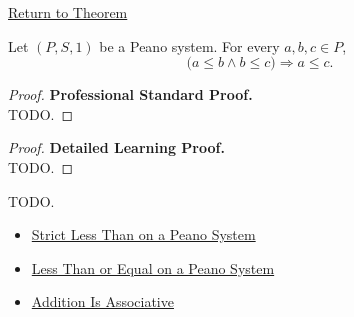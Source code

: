 \newpage
{}
\label{prf:order-transitive-on-peano-system}

\begin{remark*}[Return]
\hyperref[thm:order-transitive-on-peano-system]{Return to Theorem}
\end{remark*}

\begin{theorem*}
Let $(P,S,1)$ be a Peano system. For every $a,b,c \in P$,
\[
\bigl(a \le b \land b \le c\bigr)
\Longrightarrow
a \le c.
\]
\end{theorem*}

\begin{proof}
\textbf{Professional Standard Proof.}~\\
TODO.
\end{proof}

\begin{proof}
\textbf{Detailed Learning Proof.}~\\
TODO.
\end{proof}

\begin{remark*}
TODO.
\end{remark*}

\begin{dependencies}
\begin{itemize}
  \item \hyperref[def:strict-less-than-on-peano-system]{Strict Less Than on a Peano System}
  \item \hyperref[def:less-than-or-equal-on-peano-system]{Less Than or Equal on a Peano System}
  \item \hyperref[thm:addition-associative]{Addition Is Associative}
\end{itemize}
\end{dependencies}
